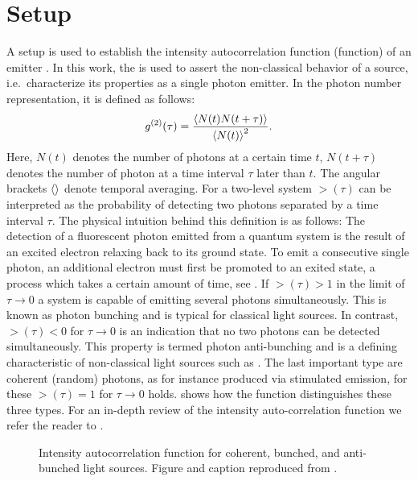 	\section{\HBT Setup}\label{sec::methods_hbt}

		A \HBT setup is used to establish the intensity autocorrelation function (\gt function) of an emitter \cite{brown1956correlation, brown1956test}.
		In this work, the \gtf is used to assert the non-classical behavior of a \pl source, i.e.\ characterize its properties as a single photon emitter.
		In the photon number representation, it is defined as follows:
		\begin{equation}
		g^{(2)}(\tau) = \frac{ \left\langle  N(t) N(t+\tau) \right\rangle }{\left\langle N(t)\right\rangle^2}.
		\end{equation}
		Here, $N(t)$ denotes the number of photons at a certain time $t$, $N(t+\tau)$ denotes the number of photon at a time interval $\tau$ later than $t$.
		The angular brackets $\left\langle \right\rangle$ denote temporal averaging.
		For a two-level system $\gt(\tau)$ can be interpreted as the probability of detecting two photons separated by a time interval $\tau$.
		The physical intuition behind this definition is as follows: The detection of a fluorescent photon emitted from a quantum system is the result of an excited electron relaxing back to its ground state. To emit a consecutive single photon, an additional electron must first be promoted to an exited state, a process which takes a certain amount of time, see . If $\gt(\tau) > 1$ in the limit of $\tau \to 0$ a system is capable of emitting several photons simultaneously. This is known as photon bunching and is typical for classical light sources. In contrast, $\gt(\tau) < 0$ for $\tau \to 0$ is an indication that no two photons can be detected simultaneously. This property is termed photon anti-bunching and is a defining characteristic of non-classical light sources such as \sps. The last important type are coherent (random) photons, as for instance produced via stimulated emission, for these  $\gt(\tau) = 1$ for $\tau \to 0$ holds.  shows how the \gt function distinguishes these three types. For an in-depth review of the intensity auto-correlation function we refer the reader to \cite{Neu2012, Fox2006}.

		\begin{figure}[!htb]
			\centering
			\caption[Sketch of typical \gt functions]{Intensity autocorrelation function for coherent, bunched, and anti-bunched light sources. Figure and caption reproduced from \cite{rahbany2016towards}.}
			\label{fig::g2_illustration}
		\end{figure}

